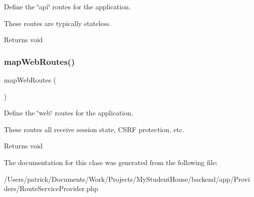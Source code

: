 Define the \char`\"{}api\char`\"{} routes for the application.

These routes are typically stateless.

\begin{DoxyReturn}{Returns}
void 
\end{DoxyReturn}
\mbox{\label{class_app_1_1_providers_1_1_route_service_provider_ac887962db9a9a8f344572bd205a02165}} 
\subsubsection{\texorpdfstring{mapWebRoutes()}{mapWebRoutes()}}
{\footnotesize\ttfamily map\+Web\+Routes (\begin{DoxyParamCaption}{ }\end{DoxyParamCaption})\hspace{0.3cm}{\ttfamily [protected]}}

Define the \char`\"{}web\char`\"{} routes for the application.

These routes all receive session state, C\+S\+RF protection, etc.

\begin{DoxyReturn}{Returns}
void 
\end{DoxyReturn}


The documentation for this class was generated from the following file\+:\begin{DoxyCompactItemize}
\item 
/\+Users/patrick/\+Documents/\+Work/\+Projects/\+My\+Student\+House/backend/app/\+Providers/Route\+Service\+Provider.\+php\end{DoxyCompactItemize}
